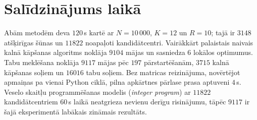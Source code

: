 \documentclass[conference]{IEEEtran}
\begin{document}
\section{Salīdzinājums laikā}

Abām metodēm deva $120$\,s kartē ar $N=10\,000$, $K=12$ un $R=10$; tajā ir $3148$ atšķirīgas šūnas un $11822$ noapaļoti kandidātcentri.
Vairākkārt palaistais naivais kalnā kāpšanas algoritms noklāja $9104$ mājas un sasniedza $6$ lokālos optimumus.
Tabu meklēšana noklāja $9117$ mājas pēc $197$ pārstartēšanām, $3715$ kalnā kāpšanas soļiem un $16016$ tabu soļiem.
Bez matricas reizinājuma, novērtējot apmaiņas pa vienai Python ciklā, pilna apkārtnes pārlase prasa aptuveni $4$\,s.
Veselo skaitļu programmēšanas modelis (\textit{integer program}) ar $11822$ kandidātcentriem $60$\,s laikā neatgrieza nevienu derīgu risinājumu, tāpēc $9117$ ir šajā eksperimentā labākais zināmais rezultāts.



\end{document}
